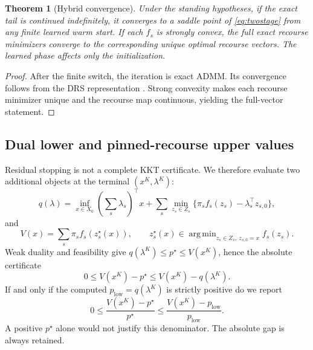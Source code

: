 \documentclass[preprint,12pt,3p]{elsarticle}
\newtheorem{theorem}{Theorem}[section]
\theoremstyle{definition}
\DeclareMathOperator*{\argmin}{arg\,min}
\begin{document}
\begin{theorem}[Hybrid convergence]\label{thm:hybrid}
Under the standing hypotheses, if the exact tail is continued indefinitely, it converges to a saddle point of \eqref{eq:twostage} from any finite learned warm start. If each $f_s$ is strongly convex, the full exact recourse minimizers converge to the corresponding unique optimal recourse vectors. The learned phase affects only the initialization.
\end{theorem}
\begin{proof}
After the finite switch, the iteration is exact ADMM. Its convergence follows from the DRS representation \cite{eckstein1992douglas,eckstein2015understanding}. Strong convexity makes each recourse minimizer unique and the recourse map continuous, yielding the full-vector statement.
\end{proof}

\subsection{Dual lower and pinned-recourse upper values}\label{sec:certificates}
Residual stopping is not a complete KKT certificate. We therefore evaluate two additional objects at the terminal $(x^K,\lambda^K)$:
\begin{equation}
q(\lambda)=\inf_{x\in X_0}\left(\sum_s\lambda_s\right)^\top x
+\sum_s\min_{z_s\in Z_s}\{\pi_s f_s(z_s)-\lambda_s^\top z_{s,0}\},
\label{eq:dual}
\end{equation}
and
\begin{equation}
V(x)=\sum_s\pi_s f_s(z_s^\star(x)),\qquad
z_s^\star(x)\in\argmin_{z_s\in Z_s,\ z_{s,0}=x}f_s(z_s).
\label{eq:pinned}
\end{equation}
Weak duality and feasibility give $q(\lambda^K)\leq p^\star\leq V(x^K)$, hence the absolute certificate
\[
0\leq V(x^K)-p^\star\leq V(x^K)-q(\lambda^K).
\]
If and only if the computed $p_{\mathrm{low}}=q(\lambda^K)$ is strictly positive do we report
\[
0\leq\frac{V(x^K)-p^\star}{p^\star}\leq\frac{V(x^K)-p_{\mathrm{low}}}{p_{\mathrm{low}}}.
\]
A positive $p^\star$ alone would not justify this denominator. The absolute gap is always retained.
\end{document}
